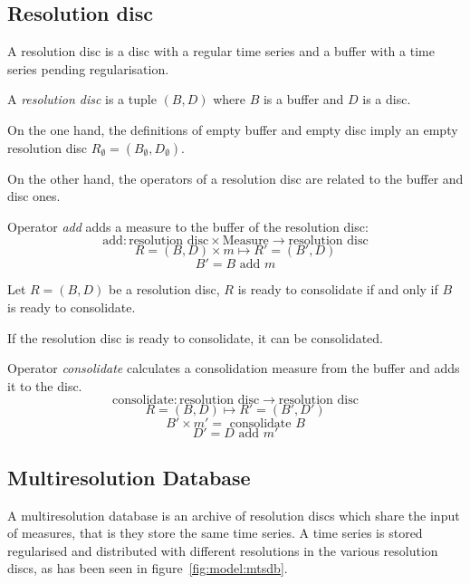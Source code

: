 \subsection{Resolution disc}

A resolution disc is a disc with a regular time series and a buffer
with a time series pending regularisation.

\begin{definition}
  A \emph{resolution disc} is a tuple $(B,D)$ where $B$
  is a buffer and $D$ is a disc.
\end{definition}
 
On the one hand, the definitions of empty buffer and empty disc imply
an empty resolution disc $R_{\emptyset} = (B_{\emptyset},D_{\emptyset})$.

On the other hand, the operators of a resolution disc are related to
the buffer and disc ones.

\begin{definition}
  Operator \emph{add} adds a measure  to the buffer of the resolution disc:
  \[
  \text{add}: \text{resolution disc} \times \text{Measure}
  \longrightarrow \text{resolution disc}
  \]
  \[
  R=(B,D) \times m \mapsto R'= (B',D)
  \]
  \[
  B'= B \text{ add } m
  \]
\end{definition}

\begin{definition}
  Let $R=(B,D)$ be a resolution disc, $R$ is ready to consolidate if
  and only if $B$ is ready to consolidate.
\end{definition}

If the resolution disc is ready to consolidate, it can be consolidated.

\begin{definition}
  Operator \emph{consolidate} calculates a consolidation measure from
  the buffer and adds it to the disc.
  \[
  \text{consolidate}: \text{resolution disc} \longrightarrow
  \text{resolution disc}
  \]
  \[
  R=(B,D) \mapsto R'= (B',D')
  \]
  \[
  B' \times m'= \text{ consolidate } B 
  \]
  \[
  D'= D \text{ add } m'
  \]
\end{definition}



\subsection{Multiresolution Database}\label{sec:model:rrd}

A multiresolution database is an archive of resolution discs which
share the input of measures, that is they store the same time
series. A time series is stored regularised and distributed with
different resolutions in the various resolution discs, as has been seen
in figure~\ref{fig:model:mtsdb}.

